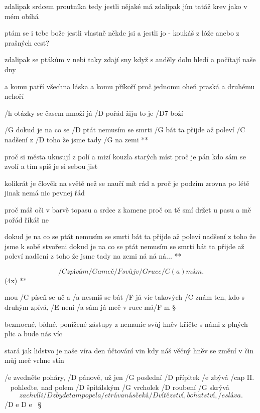 zdalipak srdcem proutníka tedy jestli nějaké má
zdalipak jím tatáž krev jako v mém obíhá \s

ptám se i tebe bože jestli vlastně někde jsi
a jestli jo - koukáš z lóže anebo z prašných cest? \s

zdalipak se ptákům v nebi taky zdají sny
když s anděly dolu hledí a počítají naše dny \s

a komu patří všechna láska a komu příkoří
proč jednomu oheň praská a druhému nehoří \s

/h otázky se časem množí já /D pořád žiju to je /D7 boží

\R  /G dokud je na co se /D ptát nemusím se smrti /G bát
    ta přijde až poleví /C nadšení z /D toho že jsme tady /G na zemi **

proč si města ukusují z polí a mizí kouzla starých míst
proč je pán kdo sám se zvolí a tím spíš je si sebou jist \s

kolikrát je člověk na světě než se naučí mít rád
a proč je podzim zrovna po létě jinak nemá nic pevnej řád \s

proč máš oči v barvě topasu a srdce z kamene
proč on tě smí držet u pasu a mě pořád říkáš ne

\R  dokud je na co se ptát nemusím se smrti bát
    ta přijde až poleví nadšení z toho že jsme k sobě stvořeni \s
    dokud je na co se ptát nemusím se smrti bát
    ta přijde až poleví nadšení z toho že jsme tady na zemi \s
    ná ná ná... **




\R \[ /C zpívám /G a meč /F svůj v /G ruce /{C (a)} mám. \](4x) **

mou /C píseň se uč a /a nesmíš se bát
/F já víc takových /C znám
ten, kdo s druhým zpívá, /E není /a sám
já meč v ruce má/F m \S

bezmocné, bídné, ponížené
zástupy z nemanic
svůj hněv křičte s námi z plných plic
a bude nás víc \s

stará jak lidstvo je naše víra
den účtování vin
kdy náš věčný hněv se změní v čin
můj meč vrhne stín \s




/e zvedněte poháry, /D pánové, už jen /G poslední /D přípitek /e zbývá /{cap II.} ~
pohleďte, nad polem /D špitálským /G vrcholek /D roubení /G skrývá
\[ za chvíli /D zbyde tam popel a /e tráva
    nás čeká /D vítězství, bohatství, /e sláva. \] /{D e D e} ~\S

